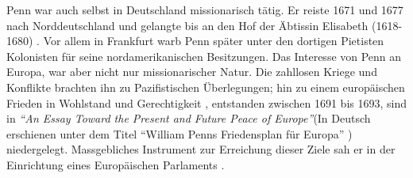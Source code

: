 \medskip

Penn war auch selbst in Deutschland missionarisch tätig. Er reiste 1671 und 1677
nach Norddeutschland  und gelangte bis an den Hof
der Äbtissin Elisabeth (1618-1680) . Vor
allem in Frankfurt  warb Penn später unter den dortigen
Pietisten
Kolonisten  für seine nordamerikanischen
 Besitzungen. Das Interesse von Penn an Europa, war
aber nicht nur missionarischer Natur. Die zahllosen Kriege und Konflikte brachten
ihn zu Pazifistischen 
Überlegungen; hin zu einem europäischen Frieden  in
Wohlstand  und Gerechtigkeit , entstanden
zwischen 1691 bis 1693, sind in \textit{"`An Essay Toward the Present and Future
Peace
of Europe"'}(In Deutsch erschienen unter dem Titel "`William Penns Friedensplan
für Europa"' ) niedergelegt. Massgebliches Instrument zur Erreichung dieser
Ziele sah er in der Einrichtung eines Europäischen Parlaments
.